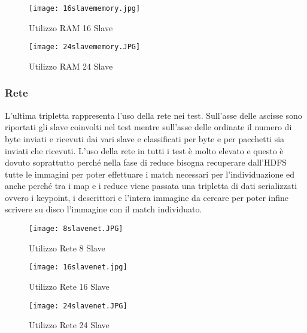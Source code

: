 \begin{figure}[H]
	\begin{center}
		\texttt{[image: 16slavememory.jpg]}
		\caption{Utilizzo RAM 16 Slave}
		\label{fg:16slavememory.JPG}
	\end{center}
\end{figure}

\begin{figure}[H]
	\begin{center}
		\texttt{[image: 24slavememory.JPG]}
		\caption{Utilizzo RAM 24 Slave}
		\label{fg:24slavememory.JPG}
	\end{center}
\end{figure}

\subsubsection{Rete}
L'ultima tripletta rappresenta l'uso della rete nei test. Sull'asse delle ascisse sono riportati gli slave coinvolti nel test mentre sull'asse delle ordinate il numero di byte inviati e ricevuti dai vari slave e classificati per byte e per pacchetti sia inviati che ricevuti. L'uso della rete in tutti i test è molto elevato e questo è dovuto soprattutto perché nella fase di reduce bisogna recuperare dall'HDFS tutte le immagini per poter effettuare i match necessari per l'individuazione ed anche perché tra i map e i reduce viene passata una tripletta di dati serializzati ovvero i keypoint, i descrittori e l'intera immagine da cercare per poter infine scrivere su disco l'immagine con il match individuato.

\begin{figure}[H]
	\begin{center}
		\texttt{[image: 8slavenet.JPG]}
		\caption{Utilizzo Rete 8 Slave}
		\label{fg:8slavenet.JPG}
	\end{center}
\end{figure}

\begin{figure}[H]
	\begin{center}
		\texttt{[image: 16slavenet.jpg]}
		\caption{Utilizzo Rete 16 Slave}
		\label{fg:16slavenet.JPG}
	\end{center}
\end{figure}

\begin{figure}[H]
	\begin{center}
		\texttt{[image: 24slavenet.JPG]}
		\caption{Utilizzo Rete 24 Slave}
		\label{fg:24slavenet.JPG}
	\end{center}
\end{figure}

